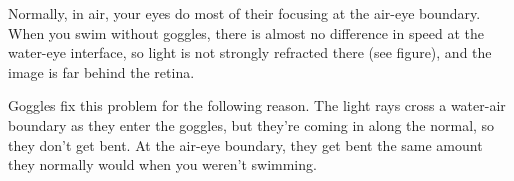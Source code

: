 Normally, in air, your eyes do most of their focusing at
the air-eye boundary. When you swim without goggles,
there is almost no difference in speed at the
water-eye interface, so light is not strongly refracted there
(see figure), and the image is far behind the retina.

Goggles fix this problem for the following reason.
The light rays cross a water-air boundary as they enter
the goggles, but they're coming in along the normal, so
they don't get bent. At the air-eye boundary, they get
bent the same amount they normally would when you
weren't swimming.

